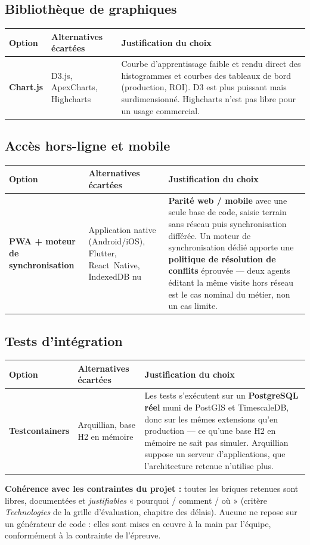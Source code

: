 \subsection{Bibliothèque de graphiques}
\begin{xltabular}{\textwidth}{>{\bfseries}p{2.7cm} p{4.2cm} X}
\toprule
\textbf{Option} & \textbf{Alternatives écartées} & \textbf{Justification du choix} \\
\midrule
\endhead
Chart.js & D3.js, ApexCharts, Highcharts & Courbe d'apprentissage faible et rendu direct des histogrammes et courbes des tableaux de bord (production, ROI). D3 est plus puissant mais surdimensionné. Highcharts n'est pas libre pour un usage commercial. \\
\bottomrule
\end{xltabular}

\subsection{Accès hors-ligne et mobile}
\begin{xltabular}{\textwidth}{>{\bfseries}p{2.7cm} p{4.2cm} X}
\toprule
\textbf{Option} & \textbf{Alternatives écartées} & \textbf{Justification du choix} \\
\midrule
\endhead
PWA + moteur de synchronisation & Application native (Android/iOS), Flutter, React~Native, IndexedDB nu & \textbf{Parité web / mobile} avec une seule base de code, saisie terrain sans réseau puis synchronisation différée. Un moteur de synchronisation dédié apporte une \textbf{politique de résolution de conflits} éprouvée --- deux agents éditant la même visite hors réseau est le cas nominal du métier, non un cas limite. \\
\bottomrule
\end{xltabular}

\subsection{Tests d'intégration}
\begin{xltabular}{\textwidth}{>{\bfseries}p{2.7cm} p{4.2cm} X}
\toprule
\textbf{Option} & \textbf{Alternatives écartées} & \textbf{Justification du choix} \\
\midrule
\endhead
Testcontainers & Arquillian, base H2 en mémoire & Les tests s'exécutent sur un \textbf{PostgreSQL réel} muni de PostGIS et TimescaleDB, donc sur les mêmes extensions qu'en production --- ce qu'une base H2 en mémoire ne sait pas simuler. Arquillian suppose un serveur d'applications, que l'architecture retenue n'utilise plus. \\
\bottomrule
\end{xltabular}

\begin{encadre}
\textbf{Cohérence avec les contraintes du projet :} toutes les briques retenues
sont libres, documentées et \emph{justifiables} « pourquoi / comment / où »
(critère \emph{Technologies} de la grille d'évaluation, chapitre des délais).
Aucune ne repose sur un générateur de code : elles sont mises en \oe uvre à la
main par l'équipe, conformément à la contrainte de l'épreuve.
\end{encadre}
